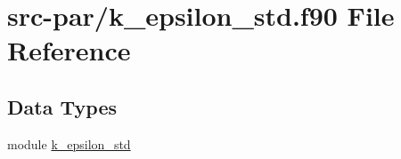 \hypertarget{k__epsilon__std_8f90}{\section{src-\/par/k\-\_\-epsilon\-\_\-std.f90 File Reference}
\label{k__epsilon__std_8f90}
}
\subsection*{Data Types}
\begin{DoxyCompactItemize}
\item 
module \hyperlink{classk__epsilon__std}{k\-\_\-epsilon\-\_\-std}
\end{DoxyCompactItemize}
